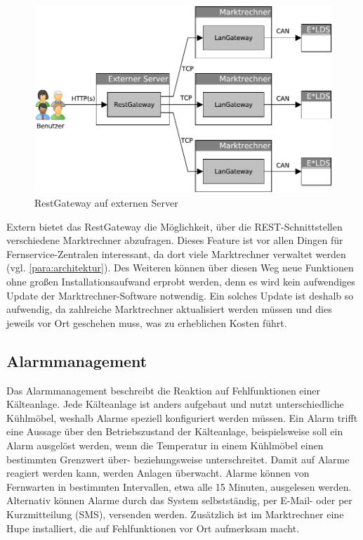 \documentclass[11pt,a4paper]{report}
\begin{document}
\begin{figure}[htbp]
\centering
\includegraphics[scale=0.7]{images/RestGateway_extern.pdf}
\caption[]{RestGateway auf externen Server}
\label{fig:rest_extern}
\end{figure}

Extern bietet das RestGateway die Möglichkeit, über die REST-Schnittstellen verschiedene Marktrechner abzufragen. Dieses Feature ist vor allen Dingen für Fernservice-Zentralen interessant, da dort viele Marktrechner verwaltet werden (vgl. \ref{para:architektur}). Des Weiteren können über diesen Weg neue Funktionen ohne großen Installationsaufwand erprobt werden, denn es wird kein aufwendiges Update der Marktrechner-Software notwendig. Ein solches Update ist deshalb so aufwendig, da zahlreiche Marktrechner aktualisiert werden müssen und dies jeweils vor Ort geschehen muss, was zu erheblichen Kosten führt.

\subsection{Alarmmanagement} 

Das Alarmmanagement beschreibt die Reaktion auf Fehlfunktionen einer Kälteanlage. Jede Kälteanlage ist anders aufgebaut und nutzt unterschiedliche Kühlmöbel, weshalb Alarme speziell konfiguriert werden müssen. Ein Alarm trifft eine Aussage über den Betriebszustand der Kälteanlage, beispielsweise soll ein Alarm ausgelöst werden, wenn die Temperatur in einem Kühlmöbel einen bestimmten Grenzwert über- beziehungsweise unterschreitet. Damit auf Alarme reagiert werden kann, werden Anlagen überwacht. Alarme können von Fernwarten in bestimmten Intervallen, etwa alle 15 Minuten, ausgelesen werden. Alternativ können Alarme durch das System selbstständig, per E-Mail- oder per Kurzmitteilung (SMS), versenden werden. Zusätzlich ist im Marktrechner eine Hupe installiert, die auf Fehlfunktionen vor Ort aufmerksam macht. 
\end{document}
